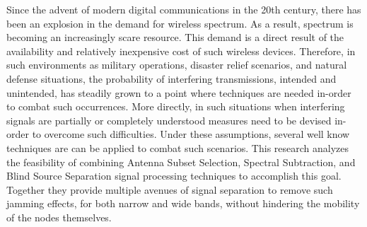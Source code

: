 Since the advent of modern digital communications in the 20th century, there has been an explosion in the demand for wireless spectrum. As a result, spectrum is becoming an increasingly scare resource. This demand is a direct result of the availability and relatively inexpensive cost of such wireless devices. Therefore, in such environments as military operations, disaster relief scenarios, and natural defense situations, the probability of interfering transmissions\cite{TBD}, intended and unintended, has steadily grown to a point where techniques are needed in-order to combat such occurrences. More directly, in such situations when interfering signals are partially or completely understood measures need to be devised in-order to overcome such difficulties. Under these assumptions, several well know techniques are can be applied to combat such scenarios.  This research analyzes the feasibility of combining Antenna Subset Selection, Spectral Subtraction, and Blind Source Separation signal processing techniques to accomplish this goal.  Together they provide multiple avenues of signal separation to remove such jamming effects, for both narrow and wide bands, without hindering the mobility of the nodes themselves.
